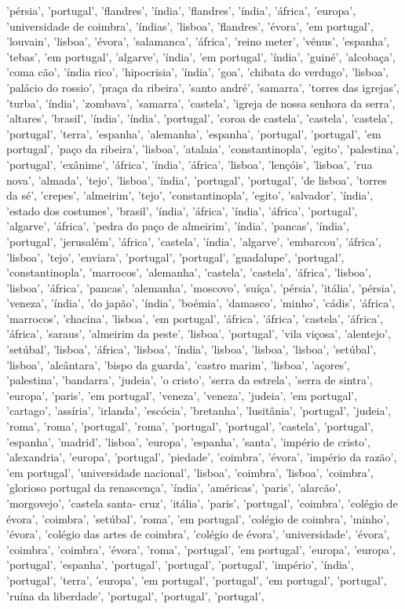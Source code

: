 \documentclass{article}
\begin{document}
\begin{itemize}
'pérsia', 'portugal', 'flandres', 'índia', 'flandres', 'índia', 'áfrica', 'europa', 'universidade de coimbra', 'índias', 'lisboa', 'flandres', 'évora', 'em portugal', 'louvain', 'lisboa', 'évora', 'salamanca', 'áfrica', 'reino meter', 'vénus', 'espanha', 'tebas', 'em portugal', 'algarve', 'índia', 'em portugal', 'índia', 'guiné', 'alcobaça', 'coma cão', 'índia rico', 'hipocrisia', 'índia', 'goa', 'chibata do verdugo', 'lisboa', 'palácio do rossio', 'praça da ribeira', 'santo andré', 'samarra', 'torres das igrejas', 'turba', 'índia', 'zombava', 'samarra', 'castela', 'igreja de nossa senhora da serra', 'altares', 'brasil', 'índia', 'índia', 'portugal', 'coroa de castela', 'castela', 'castela', 'portugal', 'terra', 'espanha', 'alemanha', 'espanha', 'portugal', 'portugal', 'em portugal', 'paço da ribeira', 'lisboa', 'atalaia', 'constantinopla', 'egito', 'palestina', 'portugal', 'exânime', 'áfrica', 'índia', 'áfrica', 'lisboa', 'lençóis', 'lisboa', 'rua nova', 'almada', 'tejo', 'lisboa', 'índia', 'portugal', 'portugal', 'de lisboa', 'torres da sé', 'crepes', 'almeirim', 'tejo', 'constantinopla', 'egito', 'salvador', 'índia', 'estado dos costumes', 'brasil', 'índia', 'áfrica', 'índia', 'áfrica', 'portugal', 'algarve', 'áfrica', 'pedra do paço de almeirim', 'índia', 'pancas', 'índia', 'portugal', 'jerusalém', 'áfrica', 'castela', 'índia', 'algarve', 'embarcou', 'áfrica', 'lisboa', 'tejo', 'enviara', 'portugal', 'portugal', 'guadalupe', 'portugal', 'constantinopla', 'marrocos', 'alemanha', 'castela', 'castela', 'áfrica', 'lisboa', 'lisboa', 'áfrica', 'pancas', 'alemanha', 'moscovo', 'suíça', 'pérsia', 'itália', 'pérsia', 'veneza', 'índia', 'do japão', 'índia', 'boémia', 'damasco', 'minho', 'cádis', 'áfrica', 'marrocos', 'chacina', 'lisboa', 'em portugal', 'áfrica', 'áfrica', 'castela', 'áfrica', 'áfrica', 'saraus', 'almeirim da peste', 'lisboa', 'portugal', 'vila viçosa', 'alentejo', 'setúbal', 'lisboa', 'áfrica', 'lisboa', 'índia', 'lisboa', 'lisboa', 'lisboa', 'setúbal', 'lisboa', 'alcântara', 'bispo da guarda', 'castro marim', 'lisboa', 'açores', 'palestina', 'bandarra', 'judeia', 'o cristo', 'serra da estrela', 'serra de sintra', 'europa', 'paris', 'em portugal', 'veneza', 'veneza', 'judeia', 'em portugal', 'cartago', 'assíria', 'irlanda', 'escócia', 'bretanha', 'lusitânia', 'portugal', 'judeia', 'roma', 'roma', 'portugal', 'roma', 'portugal', 'portugal', 'castela', 'portugal', 'espanha', 'madrid', 'lisboa', 'europa', 'espanha', 'santa', 'império de cristo', 'alexandria', 'europa', 'portugal', 'piedade', 'coimbra', 'évora', 'império da razão', 'em portugal', 'universidade nacional', 'lisboa', 'coimbra', 'lisboa', 'coimbra', 'glorioso portugal da renascença', 'índia', 'américas', 'paris', 'alarcão', 'morgovejo', 'castela santa- cruz', 'itália', 'paris', 'portugal', 'coimbra', 'colégio de évora', 'coimbra', 'setúbal', 'roma', 'em portugal', 'colégio de coimbra', 'minho', 'évora', 'colégio das artes de coimbra', 'colégio de évora', 'universidade', 'évora', 'coimbra', 'coimbra', 'évora', 'roma', 'portugal', 'em portugal', 'europa', 'europa', 'portugal', 'espanha', 'portugal', 'portugal', 'portugal', 'império', 'índia', 'portugal', 'terra', 'europa', 'em portugal', 'portugal', 'em portugal', 'portugal', 'ruína da liberdade', 'portugal', 'portugal', 'portugal', 
\end{itemize}
\end{document}
